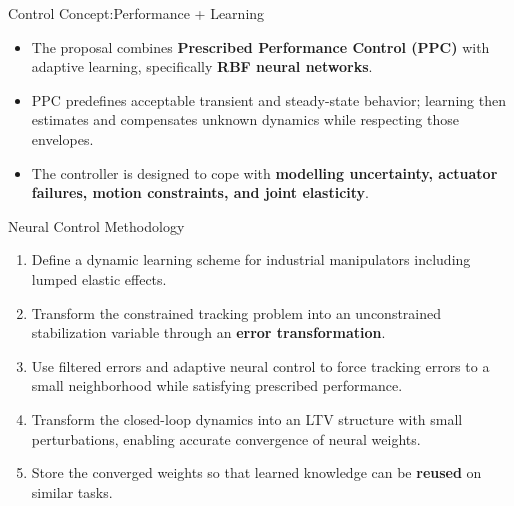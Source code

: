\documentclass[aspectratio=169,10pt]{beamer}
\begin{document}
\begin{frame}{Control Concept:\@Prescribed Performance + Learning}

\begin{itemize}
  \item The proposal combines \textbf{Prescribed Performance Control (PPC)} with adaptive learning, specifically \textbf{RBF neural networks}.
  \item PPC predefines acceptable transient and steady-state behavior; learning then estimates and compensates unknown dynamics while respecting those envelopes.
  \item The controller is designed to cope with \textbf{modelling uncertainty, actuator failures, motion constraints, and joint elasticity}. 
\end{itemize}

\end{frame}


\begin{frame}{Neural Control Methodology}

\small
\begin{enumerate}
  \item Define a dynamic learning scheme for industrial manipulators including lumped elastic effects.
  \item Transform the constrained tracking problem into an unconstrained stabilization variable through an \textbf{error transformation}.
  \item Use filtered errors and adaptive neural control to force tracking errors to a small neighborhood while satisfying prescribed performance.
  \item Transform the closed-loop dynamics into an LTV structure with small perturbations, enabling accurate convergence of neural weights.
  \item Store the converged weights so that learned knowledge can be \textbf{reused} on similar tasks.
\end{enumerate}

\end{frame}
\end{document}

